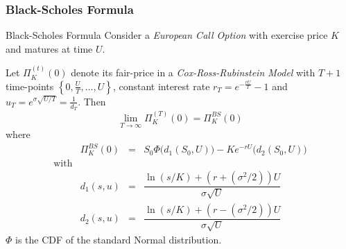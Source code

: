 \documentclass[11pt,a4paper]{article}
\begin{document}
\subsubsection{Black-Scholes Formula}

  \begin{theorem}{Black-Scholes Formula}\label{the_black_scholes_formula}
    Consider a \textit{European Call Option} with exercise price $K$ and matures at time $U$.
    \par Let $\Pi_K^{(t)}(0)$ denote its fair-price in a \textit{Cox-Ross-Rubinstein Model} with $T+1$ time-points $\left\{0,\frac{U}T,\dots,U\right\}$, constant interest rate $r_T=e^{-\frac{rU}T}-1$ and $u_T=e^{\sigma\sqrt{U/T}}=\frac1{d_T}$. Then
    \[ \lim_{T\to\infty}\Pi_K^{(T)}(0)=\Pi_K^{BS}(0) \]
    where
    \[\begin{array}{rrcl}
      &\Pi_K^{BS}(0)&=&S_0\Phi\big(d_1(S_0,U)\big)-Ke^{-rU}\big(d_2(S_0,U)\big)\\
      \text{with}\\
      &d_1(s,u)&=&\dfrac{\ln(s/K)+\left(r+(\sigma^2/2)\right)U}{\sigma\sqrt{U}}\\
      &d_2(s,u)&=&\dfrac{\ln(s/K)+\left(r-(\sigma^2/2)\right)U}{\sigma\sqrt{U}}
    \end{array}\]
    $\Phi$ is the CDF of the standard Normal distribution.
  \end{theorem}
\end{document}
